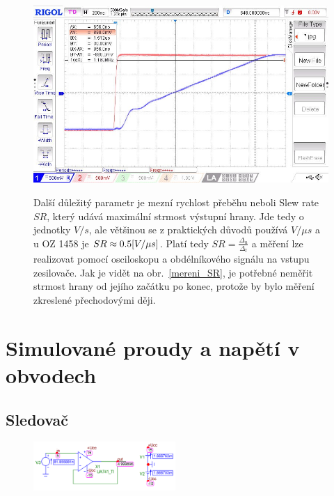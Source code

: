 \documentclass{article}
\newcommand \obr[1]
{ obr.~\ref{#1}}
\begin{document}
\begin{figure}[H]
  \begin{minipage}[t]{0.49\textwidth}
    \includegraphics[width=\textwidth]{LAB/NewFile02.jpg}
  \end{minipage}
  \hfill
  \begin{minipage}[t]{0.49\textwidth}
    \vspace{-0.5\textwidth}
    Další důležitý parametr je mezní rychlost přeběhu neboli Slew rate \(SR\), který udává maximální strmost výstupní hrany.
    Jde tedy o jednotky \(V/s\), ale většinou se z praktických důvodů používá \(V/\mu s\) a u OZ 1458 je \(SR \approx 0.5\-[V/\mu s]\).
    Platí tedy \(SR = \frac{\Delta_u}{\Delta_t}\) a měření lze realizovat pomocí osciloskopu a obdélníkového signálu na vstupu zesilovače.
    Jak je vidět na \obr{mereni_SR}, je potřebné neměřit strmost hrany od jejího začátku po konec, protože by bylo měření zkreslené přechodovými ději.
  \end{minipage}
\end{figure}  

\section*{Simulované proudy a napětí v obvodech}
\subsection*{Sledovač}
\begin{figure}[H]
  \centering
  \includegraphics[width=0.48\textwidth]{PC/Dynamic_DC/sledovač.png}
\end{figure}
\end{document}
